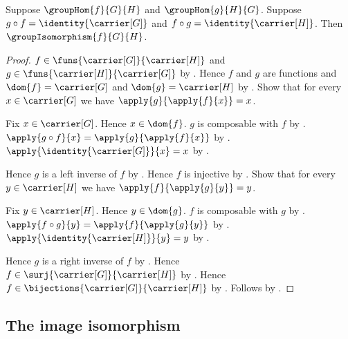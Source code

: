 \begin{theorem}\label{group_hom_two_sided_inverse_isomorphism}
    Suppose $\groupHom{f}{G}{H}$ and $\groupHom{g}{H}{G}$.
    Suppose $g\circ f=\identity{\carrier[G]}$ and
        $f\circ g=\identity{\carrier[H]}$.
    Then $\groupIsomorphism{f}{G}{H}$.
\end{theorem}
\begin{proof}
    $f\in\funs{\carrier[G]}{\carrier[H]}$ and
        $g\in\funs{\carrier[H]}{\carrier[G]}$ by
        .
    Hence $f$ and $g$ are functions and
        $\dom{f}=\carrier[G]$ and $\dom{g}=\carrier[H]$ by
        .
    Show that for every $x\in\carrier[G]$ we have
        $\apply{g}{\apply{f}{x}}=x$.
    \begin{subproof}
        Fix $x\in\carrier[G]$.
        Hence $x\in\dom{f}$.
        $g$ is composable with $f$ by
            .
        $\apply{g\circ f}{x}=\apply{g}{\apply{f}{x}}$ by
            .
        $\apply{\identity{\carrier[G]}}{x}=x$ by
            .
    \end{subproof}
    Hence $g$ is a left inverse of $f$ by
        .
    Hence $f$ is injective by
        .
    Show that for every $y\in\carrier[H]$ we have
        $\apply{f}{\apply{g}{y}}=y$.
    \begin{subproof}
        Fix $y\in\carrier[H]$.
        Hence $y\in\dom{g}$.
        $f$ is composable with $g$ by
            .
        $\apply{f\circ g}{y}=\apply{f}{\apply{g}{y}}$ by
            .
        $\apply{\identity{\carrier[H]}}{y}=y$ by
            .
    \end{subproof}
    Hence $g$ is a right inverse of $f$ by
        .
    Hence $f\in\surj{\carrier[G]}{\carrier[H]}$ by
        .
    Hence $f\in\bijections{\carrier[G]}{\carrier[H]}$ by
        .
    Follows by .
\end{proof}

\subsection{The image isomorphism}

